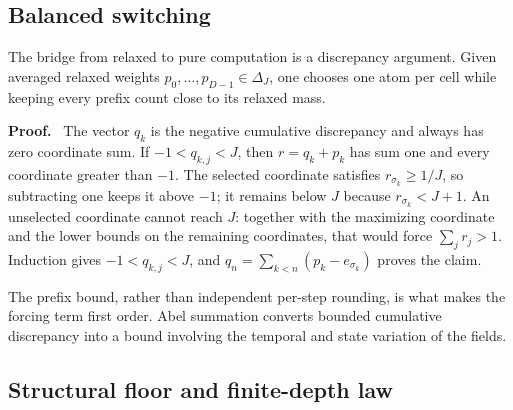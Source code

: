 \documentclass[twoside,11pt]{article}
\renewenvironment{proof}[1][Proof]{\par\noindent\textbf{#1.}\ }{\hfill\BlackBox\par\medskip}
\newcommand{\one}{\mathbf{1}}
\begin{document}
\subsection{Balanced switching}

The bridge from relaxed to pure computation is a discrepancy argument.  Given averaged relaxed weights $p_0,\ldots,p_{D-1}\in\Delta_J$, one chooses one atom per cell while keeping every prefix count close to its relaxed mass.


\begin{proof}
The vector $q_k$ is the negative cumulative discrepancy and always has zero coordinate sum.  If $-1<q_{k,j}<J$, then $r=q_k+p_k$ has sum one and every coordinate greater than $-1$.  The selected coordinate satisfies $r_{\sigma_k}\ge1/J$, so subtracting one keeps it above $-1$; it remains below $J$ because $r_{\sigma_k}<J+1$.  An unselected coordinate cannot reach $J$: together with the maximizing coordinate and the lower bounds on the remaining coordinates, that would force $\sum_jr_j>1$.  Induction gives $-1<q_{k,j}<J$, and $q_n=\sum_{k<n}(p_k-e_{\sigma_k})$ proves the claim.
\end{proof}

The prefix bound, rather than independent per-step rounding, is what makes the forcing term first order.  Abel summation converts bounded cumulative discrepancy into a bound involving the temporal and state variation of the fields.

\subsection{Structural floor and finite-depth law}
\end{document}
